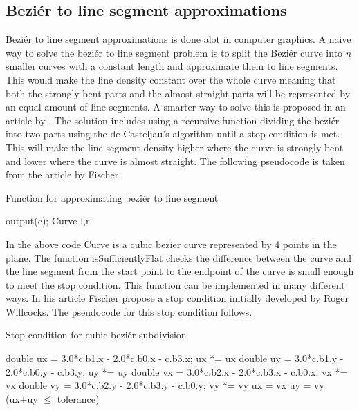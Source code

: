 \subsection{Beziér to line segment approximations}
Beziér to line segment approximations is done alot in computer graphics. A naive way to solve the beziér to line segment problem is to split the Beziér curve into $n$ smaller curves with a constant length and approximate them to line segments. This would make the line density constant over the whole curve meaning that both the strongly bent parts and the almost straight parts will be represented by an equal amount of line segments. A smarter way to solve this is proposed in an article by \citet{fischer2000}. The solution includes using a recursive function dividing the beziér into two parts using the de Casteljau's algorithm until a stop condition is met. This will make the line segment density higher where the curve is strongly bent and lower where the curve is almost straight. The following pseudocode is taken from the article by Fischer.
\begin{algorithm}[H]
\caption{Function for approximating beziér to line segment}
\begin{algorithmic}
  \State output(c);
\Else
	\State Curve l,r\;
	\State{}\;
	\State{}\;
	\State{}\;
\EndIf
\EndProcedure
\end{algorithmic}
\end{algorithm}
In the above code Curve is a cubic bezier curve represented by 4 points in the plane. The function isSufficientlyFlat checks the difference between the curve and the line segment from the start point to the endpoint of the curve is small enough to meet the stop condition. This function can be implemented in many different ways. In his article Fischer propose a stop condition initially developed by Roger Willcocks. The pseudocode for this stop condition follows.

\begin{algorithm}[H]
\caption{Stop condition for cubic beziér subdivision}
\begin{algorithmic}
	\State double ux = 3.0*c.b1.x - 2.0*c.b0.x - c.b3.x; ux *= ux\;
	\State double uy = 3.0*c.b1.y - 2.0*c.b0.y - c.b3.y; uy *= uy\;
	\State double vx = 3.0*c.b2.x - 2.0*c.b3.x - c.b0.x; vx *= vx\;
	\State double vy = 3.0*c.b2.y - 2.0*c.b3.y - c.b0.y; vy *= vy\;
	\State ux = vx\; 	
	\EndIf
		\State uy = vy\; 
	\EndIf
	\State\Return (ux+uy $\leq$ tolerance)\;
\EndFunction
\end{algorithmic}
\end{algorithm}

